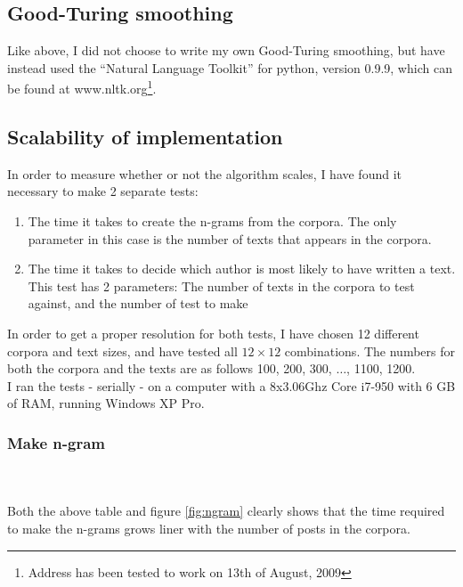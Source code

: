 \subsection{Good-Turing smoothing}
Like above, I did not choose to write my own Good-Turing smoothing, but have instead used the ``Natural Language Toolkit'' for python, version 0.9.9, which can be found at www.nltk.org\footnote{Address has been tested to work on 13th of August, 2009}.

\subsection{Scalability of implementation}
In order to measure whether or not the algorithm scales, I have found it necessary to make 2 separate tests: 
\begin{enumerate}
\item The time it takes to create the n-grams from the corpora. The only parameter in this case is the number of texts that appears in the corpora.
\item The time it takes to decide which author is most likely to have written a text. This test has 2 parameters: The number of texts in the corpora to test against, and the number of test to make
\end{enumerate}

In order to get a proper resolution for both tests, I have chosen 12 different corpora and text sizes, and have tested all $12 \times 12$ combinations. The numbers for both the corpora and the texts are as follows 100, 200, 300, $\ldots$, 1100, 1200.\\

I ran the tests - serially - on a computer with a 8x3.06Ghz Core i7-950 with 6 GB of RAM, running Windows XP Pro. 

\subsubsection{Make n-gram}
\\ \\

Both the above table and figure \ref{fig:ngram} clearly shows that the time required to make the n-grams grows liner with the number of posts in the corpora.

